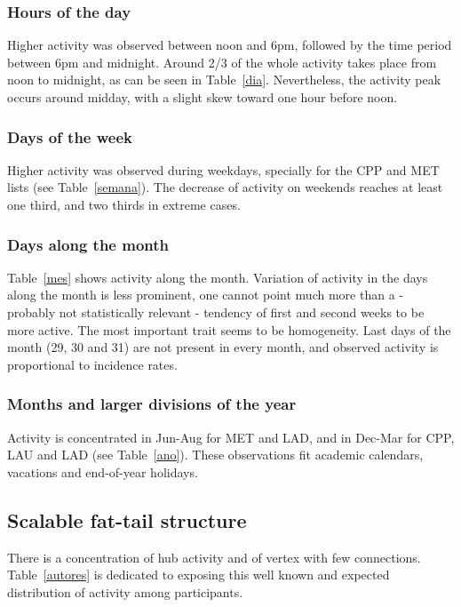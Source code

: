 \documentclass[%
 aip,
 jmp,%
 amsmath,amssymb,
 reprint,%
]{revtex4-1}
\begin{document}
\subsubsection{Hours of the day}
Higher activity was observed between noon and 6pm, followed by the time period between 6pm and midnight. Around 2/3 of the whole activity takes place from noon to midnight, as can be seen in Table~\ref{dia}. Nevertheless, the activity peak occurs around midday, with a slight skew toward one hour before noon.

\subsubsection{Days of the week}
Higher activity was observed during weekdays, specially for the CPP and MET lists (see Table~\ref{semana}). The decrease of activity on weekends reaches at least one third, and two thirds in extreme cases.

\subsubsection{Days along the month}
Table~\ref{mes} shows activity along the month. Variation of activity in the days along the month is less prominent, one cannot point much more than a - probably not statistically relevant - tendency of first and second weeks to be more active. The most important trait seems to be homogeneity. Last days of the month (29, 30 and 31) are not present in every month, and observed activity is proportional to incidence rates.

\subsubsection{Months and larger divisions of the year}
 Activity is concentrated in Jun-Aug for MET and LAD, and in Dec-Mar for CPP, LAU and LAD (see Table~\ref{ano}). These observations fit academic calendars, vacations and end-of-year holidays.

\subsection{Scalable fat-tail structure}\label{subsec:pih}
There is a concentration of hub activity and of vertex with few connections. Table~\ref{autores} is dedicated to exposing this well known and expected distribution of activity among participants.
\end{document}
